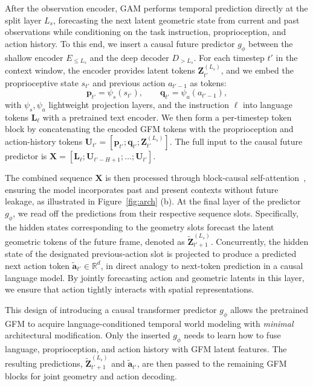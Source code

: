 After the observation encoder, GAM performs temporal prediction directly at the split layer $L_s$, forecasting the next latent geometric state from current and past observations while conditioning on the task instruction, proprioception, and action history. To this end, we insert a causal future predictor $g_\phi$ between the shallow encoder $E_{\leq L_s}$ and the deep decoder $D_{>L_s}$.
For each timestep $t'$ in the context window, the encoder provides latent tokens $\mathbf{Z}_{t'}^{(L_s)}$, and we embed the proprioceptive state $s_{t'}$ and previous action $a_{t'-1}$ as tokens:
\begin{equation}
    \mathbf{p}_{t'} = \psi_s(s_{t'}), 
    \qquad
    \mathbf{q}_{t'} = \psi_a(a_{t'-1}),
\end{equation}
with $\psi_s, \psi_a$ lightweight projection layers, and the instruction $\ell$ into language tokens $\mathbf{L}_{\ell}$ with a pretrained text encoder. We then form a per-timestep token block by concatenating the encoded GFM tokens with the proprioception and action-history tokens $\mathbf{U}_{t'}=[\mathbf{p}_{t'};\mathbf{q}_{t'};\mathbf{Z}_{t'}^{(L_s)}]$. The full input to the causal future predictor is $\mathbf{X} = [\mathbf{L}_\ell; \mathbf{U}_{t'-H+1}; \ldots; \mathbf{U}_{t'}]$.

The combined sequence $\mathbf{X}$ is then processed through block-causal self-attention~\citep{wang2025pi}, ensuring the model incorporates past and present contexts without future leakage, as illustrated in Figure~\ref{fig:arch} (b). At the final layer of the predictor $g_\phi$, we read off the predictions from their respective sequence slots. Specifically, the hidden states corresponding to the geometry slots forecast the latent geometric tokens of the future frame, denoted as $\tilde{\mathbf{Z}}_{t'+1}^{(L_s)}$. Concurrently, the hidden state of the designated previous-action slot is projected to produce a predicted next action token $\tilde{\mathbf{a}}_{t'} \in \mathbb{R}^{d}$, in direct analogy to next-token prediction in a causal language model. By jointly forecasting action and geometric latents in this layer, we ensure that action tightly interacts with spatial representations.

This design of introducing a causal transformer predictor $g_\phi$ allows the pretrained GFM to acquire language-conditioned temporal world modeling with \textit{minimal} architectural modification. Only the inserted $g_\phi$ needs to learn how to fuse language, proprioception, and action history with GFM latent features. The resulting predictions, $\widetilde{\mathbf{Z}}_{t'+1}^{(L_s)}$ and $\tilde{\mathbf{a}}_{t'}$, are then passed to the remaining GFM blocks for joint geometry and action decoding.

